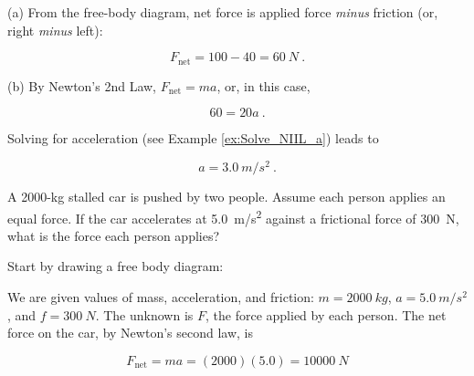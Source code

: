 \documentclass[main.tex]{subfiles}
\begin{document}
\Solution (a) From the free-body diagram, net force is applied force \textit{minus} friction (or, right \textit{minus} left):

\begin{equation*}
    F_{\text{net}} = 100 - 40 = \SI{60}{N}\ .
\end{equation*}


(b) By Newton's 2nd Law, $F_{\text{net}} = m a$, or, in this case,

\begin{equation*}
    60 = 20 a\ .
\end{equation*}

Solving for acceleration (see Example \ref{ex:Solve_NIIL_a}) leads to

\begin{equation*}
    a = \SI{3.0}{m/s^2}\ .
\end{equation*}



\begin{example} \label{ex:StalledCar} 
A 2000-kg stalled car is pushed by two people. Assume each person applies an equal force. If the car accelerates at \SI{5.0}{m/s^2} against a frictional force of \SI{300}{N}, what is the force each person applies? 
\end{example}

\Solution Start by drawing a free body diagram:

\begin{center}
    
\end{center}


We are given values of mass, acceleration, and friction: $m = \SI{2000}{kg}$, $a = \SI{5.0}{m/s^2}$, and $f = \SI{300}{N}$. The unknown is $F$, the force applied by each person. The net force on the car, by Newton's second law, is

\begin{equation*}
    F_{\text{net}} = ma = (2000)(5.0) = \SI{10000}{N}
\end{equation*}
\end{document}
